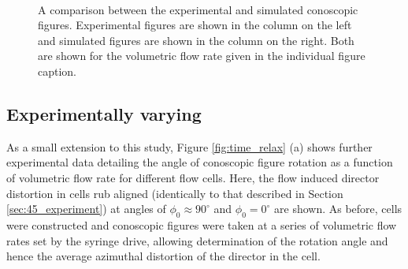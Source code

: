 \begin{figure}
\begin{center}
\\
\end{center}
\caption[Comparison between experimental and simulated conoscopic figures ($\phi_0=45^{\circ}$)]{\label{fig:45_model_data} A comparison between the experimental and simulated conoscopic figures. Experimental figures are shown in the column on the left and simulated figures are shown in the column on the right. Both are shown for the volumetric flow rate given in the individual figure caption.}
\end{figure}

\subsection{Experimentally varying}
As a small extension to this study, Figure \ref{fig:time_relax} (a) shows further experimental data detailing the angle of conoscopic figure rotation as a function of volumetric flow rate for different flow cells. Here, the flow induced director distortion in cells rub aligned (identically to that described in Section \ref{sec:45_experiment}) at angles of $\phi_0\approx90^{\circ}$ and $\phi_0=0^{\circ}$ are shown. As before, cells were constructed and conoscopic figures were taken at a series of volumetric flow rates set by the syringe drive, allowing determination of the rotation angle and hence the average azimuthal distortion of the director in the cell.

